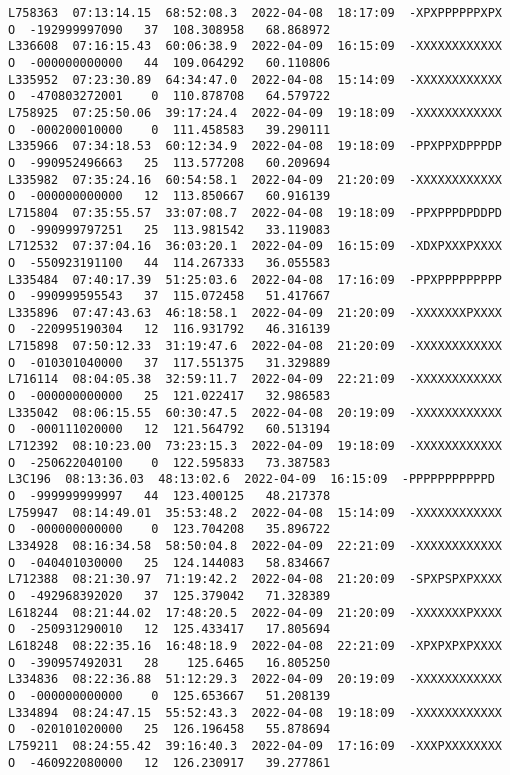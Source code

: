 \documentclass[12pt]{article}
\begin{document}
\begin{verbatim}
L758363  07:13:14.15  68:52:08.3  2022-04-08  18:17:09  -XPXPPPPPPXPX  O  -192999997090   37  108.308958   68.868972
L336608  07:16:15.43  60:06:38.9  2022-04-09  16:15:09  -XXXXXXXXXXXX  O  -000000000000   44  109.064292   60.110806
L335952  07:23:30.89  64:34:47.0  2022-04-08  15:14:09  -XXXXXXXXXXXX  O  -470803272001    0  110.878708   64.579722
L758925  07:25:50.06  39:17:24.4  2022-04-09  19:18:09  -XXXXXXXXXXXX  O  -000200010000    0  111.458583   39.290111
L335966  07:34:18.53  60:12:34.9  2022-04-08  19:18:09  -PPXPPXDPPPDP  O  -990952496663   25  113.577208   60.209694
L335982  07:35:24.16  60:54:58.1  2022-04-09  21:20:09  -XXXXXXXXXXXX  O  -000000000000   12  113.850667   60.916139
L715804  07:35:55.57  33:07:08.7  2022-04-08  19:18:09  -PPXPPPDPDDPD  O  -990999797251   25  113.981542   33.119083
L712532  07:37:04.16  36:03:20.1  2022-04-09  16:15:09  -XDXPXXXPXXXX  O  -550923191100   44  114.267333   36.055583
L335484  07:40:17.39  51:25:03.6  2022-04-08  17:16:09  -PPXPPPPPPPPP  O  -990999595543   37  115.072458   51.417667
L335896  07:47:43.63  46:18:58.1  2022-04-09  21:20:09  -XXXXXXXPXXXX  O  -220995190304   12  116.931792   46.316139
L715898  07:50:12.33  31:19:47.6  2022-04-08  21:20:09  -XXXXXXXXXXXX  O  -010301040000   37  117.551375   31.329889
L716114  08:04:05.38  32:59:11.7  2022-04-09  22:21:09  -XXXXXXXXXXXX  O  -000000000000   25  121.022417   32.986583
L335042  08:06:15.55  60:30:47.5  2022-04-08  20:19:09  -XXXXXXXXXXXX  O  -000111020000   12  121.564792   60.513194
L712392  08:10:23.00  73:23:15.3  2022-04-09  19:18:09  -XXXXXXXXXXXX  O  -250622040100    0  122.595833   73.387583
L3C196  08:13:36.03  48:13:02.6  2022-04-09  16:15:09  -PPPPPPPPPPPD  O  -999999999997   44  123.400125   48.217378
L759947  08:14:49.01  35:53:48.2  2022-04-08  15:14:09  -XXXXXXXXXXXX  O  -000000000000    0  123.704208   35.896722
L334928  08:16:34.58  58:50:04.8  2022-04-09  22:21:09  -XXXXXXXXXXXX  O  -040401030000   25  124.144083   58.834667
L712388  08:21:30.97  71:19:42.2  2022-04-08  21:20:09  -SPXPSPXPXXXX  O  -492968392020   37  125.379042   71.328389
L618244  08:21:44.02  17:48:20.5  2022-04-09  21:20:09  -XXXXXXXPXXXX  O  -250931290010   12  125.433417   17.805694
L618248  08:22:35.16  16:48:18.9  2022-04-08  22:21:09  -XPXPXPXPXXXX  O  -390957492031   28    125.6465   16.805250
L334836  08:22:36.88  51:12:29.3  2022-04-09  20:19:09  -XXXXXXXXXXXX  O  -000000000000    0  125.653667   51.208139
L334894  08:24:47.15  55:52:43.3  2022-04-08  19:18:09  -XXXXXXXXXXXX  O  -020101020000   25  126.196458   55.878694
L759211  08:24:55.42  39:16:40.3  2022-04-09  17:16:09  -XXXPXXXXXXXX  O  -460922080000   12  126.230917   39.277861

\end{verbatim}
\end{document}
